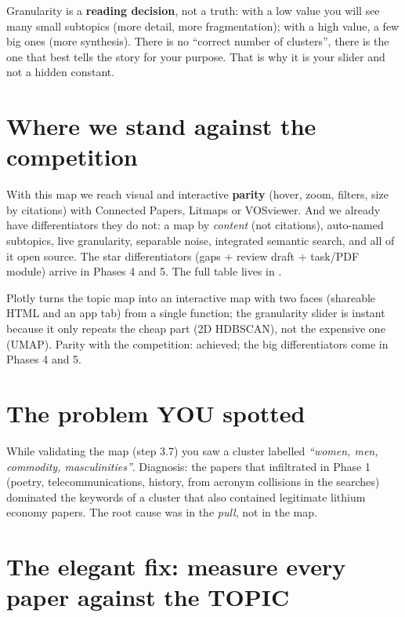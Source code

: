 \documentclass[11pt,a4paper]{article}
\begin{document}
\begin{ojo}
Granularity is a \textbf{reading decision}, not a truth: with a low value you will see many
small subtopics (more detail, more fragmentation); with a high value, a few big ones (more
synthesis). There is no ``correct number of clusters'', there is the one that best tells the
story for your purpose. That is why it is your slider and not a hidden constant.
\end{ojo}

\section{Where we stand against the competition}

With this map we reach visual and interactive \textbf{parity} (hover, zoom, filters, size by
citations) with Connected Papers, Litmaps or VOSviewer. And we already have differentiators
they do not: a map by \emph{content} (not citations), auto-named subtopics, live granularity,
separable noise, integrated semantic search, and all of it open source. The star
differentiators (gaps $+$ review draft $+$ task/PDF module) arrive in Phases 4 and 5. The full
table lives in .

\begin{resumen}
Plotly turns the topic map into an interactive map with two faces (shareable HTML and an app
tab) from a single function; the granularity slider is instant because it only repeats the
cheap part (2D HDBSCAN), not the expensive one (UMAP). Parity with the competition: achieved;
the big differentiators come in Phases 4 and 5.
\end{resumen}
\clearpage
{}
{}

\section{The problem YOU spotted}

While validating the map (step 3.7) you saw a cluster labelled \emph{``women, men, commodity,
masculinities''}. Diagnosis: the papers that infiltrated in Phase 1 (poetry,
telecommunications, history, from acronym collisions in the searches) dominated the keywords
of a cluster that also contained legitimate lithium economy papers. The root cause was in the
\emph{pull}, not in the map.

\section{The elegant fix: measure every paper against the TOPIC}
\end{document}
